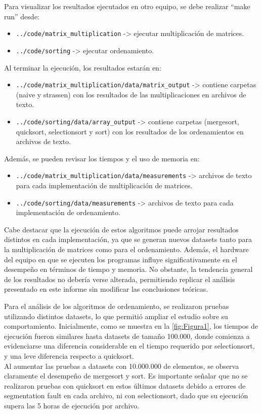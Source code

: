 Para visualizar los resultados ejecutados en otro equipo, se debe realizar “make run” desde:
\begin{itemize}
    \item \texttt{../code/matrix\_multiplication} -> ejecutar multiplicación de matrices.
    \item \texttt{../code/sorting} -> ejecutar ordenamiento.
\end{itemize}

Al terminar la ejecución, los resultados estarán en:
\begin{itemize}
    \item \texttt{../code/matrix\_multiplication/data/matrix\_output} -> contiene carpetas (naive y strassen) con los resultados de las multiplicaciones en archivos de texto.
    \item \texttt{../code/sorting/data/array\_output} -> contiene carpetas (mergesort, quicksort, selectionsort y sort) con los resultados de los ordenamientos en archivos de texto.
\end{itemize}

Además, se pueden revisar los tiempos y el uso de memoria en:
\begin{itemize}
    \item \texttt{../code/matrix\_multiplication/data/measurements} -> archivos de texto para cada implementación de multiplicación de matrices.
    \item \texttt{../code/sorting/data/measurements} -> archivos de texto para cada implementación de ordenamiento.
\end{itemize}

Cabe destacar que la ejecución de estos algoritmos puede arrojar resultados distintos en cada implementación, ya que se generan nuevos datasets tanto para la multiplicación de matrices como para el ordenamiento. Además, el hardware del equipo en que se ejecuten los programas influye significativamente en el desempeño en términos de tiempo y memoria. No obstante, la tendencia general de los resultados no debería verse alterada, permitiendo replicar el análisis presentado en este informe sin modificar las conclusiones teóricas.

\newpage
Para el análisis de los algoritmos de ordenamiento, se realizaron pruebas utilizando distintos datasets, lo que permitió ampliar el estudio sobre su comportamiento. Inicialmente, como se muestra en la \autoref{fig:Figura1}, los tiempos de ejecución fueron similares hasta datasets de tamaño 100.000, donde comienza a evidenciarse una diferencia considerable en el tiempo requerido por selectionsort, y una leve diferencia respecto a quicksort.\\
Al aumentar las pruebas a datasets con 10.000.000 de elementos, se observa claramente el desempeño de mergesort y sort. Es importante señalar que no se realizaron pruebas con quicksort en estos últimos datasets debido a errores de segmentation fault en cada archivo, ni con selectionsort, dado que su ejecución supera las 5 horas de ejecución por archivo.\\


